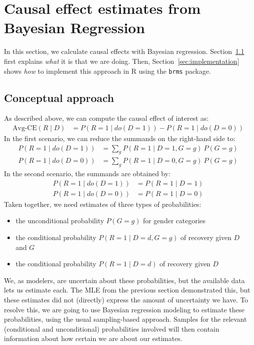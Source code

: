 \documentclass[nobib]{tufte-handout}
\newcommand{\mathdo}{\mathit{do}}
\begin{document}
\section{Causal effect estimates from Bayesian Regression} \label{sec:programming}

In this section, we calculate causal effects with Bayesian regression.
Section~\ref{sec:conceptual-approach} first explains \textit{what} it is that we are doing.
Then, Section~\ref{sec:implementation} shows \textit{how} to implement this approach in R using the \texttt{brms} package.

\subsection{Conceptual approach}
\label{sec:conceptual-approach}

As described above, we can compute the causal effect of interest as:
\begin{align*}
  \text{Avg-CE}(R \mid D) & =  P\left(R=1 \mid \mathdo(D=1)\right) - P\left(R=1 \mid \mathdo(D=0)\right)
\end{align*}
In the first scenario, we can reduce the summands on the right-hand side to:
\begin{align*}
  P\left(R=1 \mid \mathdo(D=1)\right) &= \sum_{g} P\left(R = 1 \mid D=1, G=g \right) \ P\left( G=g \right) \\
  P\left(R=1 \mid \mathdo(D=0)\right) &= \sum_{g} P\left(R = 1 \mid D=0, G=g \right) \ P\left( G=g \right)
\end{align*}
In the second scenario, the summands are obtained by:
\begin{align*}
  P\left(R=1 \mid \mathdo(D=1)\right) &= P\left(R=1\mid D=1 \right) \\
  P\left(R=1 \mid \mathdo(D=0)\right) &= P\left(R=1\mid D=0 \right)
\end{align*}
Taken together, we need estimates of three types of probabilities:
\begin{itemize}
  \item the unconditional probability $P(G=g)$ for gender categories
  \item the conditional probability $P(R=1 \mid D=d, G=g)$ of recovery given $D$ and $G$
  \item the conditional probability $P(R=1 \mid D=d)$ of recovery given $D$
\end{itemize}
We, as modelers, are uncertain about these probabilities, but the available data lets us estimate each.
The MLE from the previous section demonstrated this, but these estimates did not (directly) express the amount of uncertainty we have.
To resolve this, we are going to use Bayesian regression modeling to estimate these probabilities, using the usual sampling-based approach.
Samples for the relevant (conditional and unconditional) probabilities involved will then contain information about how certain we are about our estimates.
\end{document}
